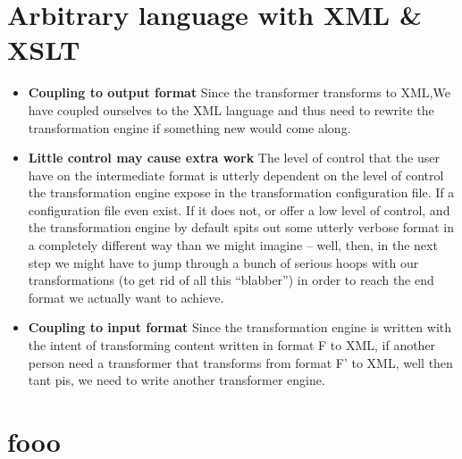 \documentclass{article}
\begin{document}
\section{Arbitrary language with XML \& XSLT}
\begin{itemize}
\item \textbf{Coupling to output format} Since the transformer transforms to XML,We have coupled ourselves to the XML language and thus need to rewrite the transformation engine if something new would come along.
\item \textbf{Little control may cause extra work} The level of control that the user have on the intermediate format is utterly dependent on the level of control the transformation engine expose in the transformation configuration file. If a configuration file even exist. If it does not, or offer a low level of control, and the transformation engine by default spits out some utterly verbose format in a completely different way than we might imagine -- well, then, in the next step we might have to jump through a bunch of serious hoops with our transformations (to get rid of all this ``blabber'') in order to reach the end format we actually want to achieve. 
\item \textbf{Coupling to input format} Since the transformation engine is written with the intent of transforming content written in format F to XML, if another person need a transformer that transforms from format F' to XML, well then tant pis, we need to write another transformer engine.
\end{itemize}







\section{fooo}
\end{document}

